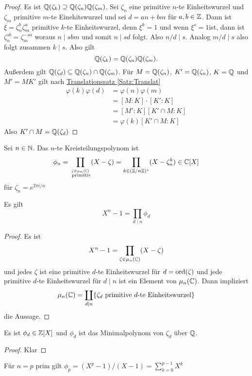 \begin{proof}
     Es ist $\mathbb{Q}(\zeta_k)\supseteq\mathbb{Q}(\zeta_n)\mathbb{Q}(\zeta_m)$.
     Sei $\zeta_n$ eine primitive $n$-te Einheitswurzel und $\zeta_m$ primitive $m$-te Einehitswurzel und sei $d=an+bm$ für $a,b\in\mathbb{Z}$.
     Dann ist $\xi=\zeta_n^b\zeta_m^a$ primitive $k$-te Einheitswurzel, denn $\xi^k=1$ und wenn $\xi^s=1$ist, dann ist $\zeta_n^{sb}=\zeta_m^{-sa}$ woraus $n\mid sbm$ und somit $n\mid sd$ folgt. Also $n/d\mid s$. Analog $m/d\mid s$ also folgt zusammen $k\mid s$. Also gilt $$\mathbb{Q}(\zeta_k)=\mathbb{Q}(\zeta_n)\mathbb{Q}(\zeta_m).$$ Außerdem gilt
     $\mathbb{Q}(\zeta_d)\subseteq \mathbb{Q}(\zeta_n)\cap\mathbb{Q}(\zeta_m)$.
     Für $M=\mathbb{Q}(\zeta_n)$, $K'=\mathbb{Q}(\zeta_n)$, $K=\mathbb{Q}$ und $M'=MK'$ gilt nach \hyperref[Satz:Translat]{Translationssatz \ref{Satz:Translat}} 
     \begin{align*}
         \varphi(k)\varphi(d)&=\varphi(n)\varphi(m)\\
         &=[M:K]\cdot [K':K]\\
         &=[M':K][K'\cap M:K]\\
         &=\varphi(k)[K'\cap M:K]
    \end{align*}
     Also $K'\cap M=\mathbb{Q}(\zeta_d)$
\end{proof}
\begin{Def}
    Sei $n\in\mathbb{N}$. Das $n$-te Kreisteilungspolynom ist $$\phi_n=\prod_{\stackrel{\zeta\in\mu_n(\mathbb{C})}{\text{ primitiv}}}(X-\zeta)=\prod_{k\in(\mathbb{Z}/n\mathbb{Z})^*}(X-\zeta_n^k)\in\mathbb{C}[X]$$ für $\zeta_n=e^{2\pi i/n}$
\end{Def}
\begin{Lemma}
Es gilt    $$X^n-1=\prod_{d\mid n}\phi_d$$
\end{Lemma}
\begin{proof}
   Es ist $$X^n-1=\prod_{\zeta\in\mu_n(\mathbb{C})}(X-\zeta)$$ und jedes $\zeta$ ist eine primitive $d$-te Einheitswurzel für $d=\operatorname{ord}(\zeta)$ und jede primitive $d$-te Einheitswurzel für $d\mid n$ ist ein Element von $\mu_n(\mathbb{C})$.
    Dann impliziert $$\mu_n(\mathbb{C})=\coprod_{d\mid n}\{\zeta_d \text{ primitive $d$-te Einheitswurzel}\}$$ die Aussage.
\end{proof}
\begin{Lemma}
 Es ist $\phi_d\in\mathbb{Z}[X]$ und $\phi_d$ ist das Minimalpolynom von $\zeta_d$ über $\mathbb{Q}$.
\end{Lemma}
\begin{proof}
    Klar
\end{proof}
\begin{Bem}
    Für $n=p$ prim gilt $\phi_p=(X^p-1)/(X-1)=\sum\limits_{k=0}^{p-1}X^k$
\end{Bem}
